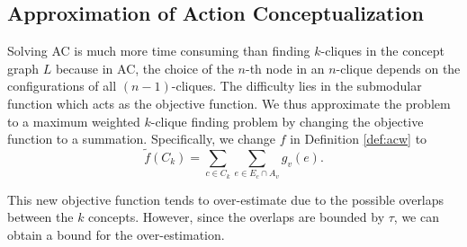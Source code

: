 \subsection{Approximation of Action Conceptualization}
Solving AC is much more time consuming than finding $k$-cliques in the
concept graph $L$ because in AC, the choice of the $n$-th node in an $n$-clique
depends on the configurations of all $(n-1)$-cliques.
The difficulty lies in the submodular function which acts
as the objective function.
We thus approximate the problem to a maximum weighted $k$-clique finding
problem by changing the objective function
to a summation. Specifically, we change $f$ in Definition \ref{def:acw} to
\begin{equation}
\tilde{f}(C_k)=\sum_{c\in C_k}{\sum_{e\in E_c\cap A_v}{g_v(e)}}.
\label{eq:approxf}
\end{equation}

This new objective function tends to over-estimate due to the
possible overlaps between the $k$ concepts.
However, since the overlaps are bounded by $\tau$,
we can obtain a bound for the over-estimation.


